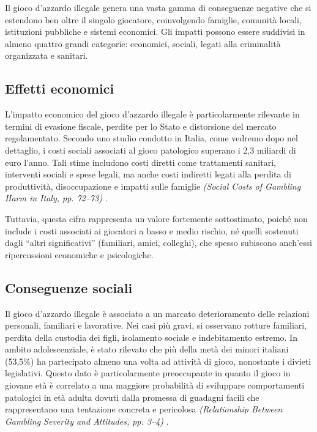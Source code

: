 \documentclass[a4paper,12pt]{article}
\begin{document}
Il gioco d’azzardo illegale genera una vasta gamma di conseguenze negative che si estendono ben oltre il singolo giocatore, coinvolgendo famiglie, comunità locali, istituzioni pubbliche e sistemi economici. Gli impatti possono essere suddivisi in almeno quattro grandi categorie: economici, sociali, legati alla criminalità organizzata e sanitari. 

\subsection{Effetti economici}

L’impatto economico del gioco d’azzardo illegale è particolarmente rilevante in termini di evasione fiscale, perdite per lo Stato e distorsione del mercato regolamentato. Secondo uno studio condotto in Italia, come vedremo dopo nel dettaglio, i costi sociali associati al gioco patologico superano i 2,3 miliardi di euro l’anno. Tali stime includono costi diretti come trattamenti sanitari, interventi sociali e spese legali, ma anche costi indiretti legati alla perdita di produttività, disoccupazione e impatti sulle famiglie \textit{(Social Costs of Gambling Harm in Italy, pp. 72--73)} \cite{lucchini2022socialcosts}.

Tuttavia, questa cifra rappresenta un valore fortemente sottostimato, poiché non include i costi associati ai giocatori a basso e medio rischio, né quelli sostenuti dagli “altri significativi” (familiari, amici, colleghi), che spesso subiscono anch’essi ripercussioni economiche e psicologiche.

\subsection{Conseguenze sociali}

Il gioco d’azzardo illegale è associato a un marcato deterioramento delle relazioni personali, familiari e lavorative. Nei casi più gravi, si osservano rotture familiari, perdita della custodia dei figli, isolamento sociale e indebitamento estremo. In ambito adolescenziale, è stato rilevato che più della metà dei minori italiani (53,5\%) ha partecipato almeno una volta ad attività di gioco, nonostante i divieti legislativi. Questo dato è particolarmente preoccupante in quanto il gioco in giovane età è correlato a una maggiore probabilità di sviluppare comportamenti patologici in età adulta dovuti dalla promessa di guadagni facili che rappresentano una tentazione concreta e pericolosa \textit{(Relationship Between Gambling Severity and Attitudes, pp. 3--4)} \cite{gori2014adolescentgambling}.
\end{document}
